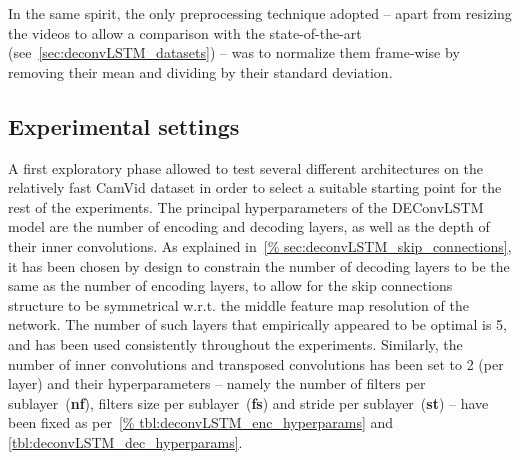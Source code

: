 In the same spirit, the only preprocessing technique adopted -- apart from
resizing the videos to allow a comparison with the state-of-the-art
(see~\autoref{sec:deconvLSTM_datasets}) -- was to normalize them frame-wise by
removing their mean and dividing by their standard deviation.

\subsection{Experimental settings}\label{sec:deconvLSTM_settings}

A first exploratory phase allowed to test several different architectures on
the relatively fast CamVid dataset in order to select a suitable starting point
for the rest of the experiments. The principal hyperparameters of the
DEConvLSTM model are the number of encoding and decoding layers, as well as the
depth of their inner convolutions. As explained in~\autoref{%
sec:deconvLSTM_skip_connections}, it has been chosen by design to constrain the
number of decoding layers to be the same as the number of encoding layers, to
allow for the skip connections structure to be symmetrical w.r.t. the middle
feature map resolution of the network. The number of such layers that
empirically appeared to be optimal is 5, and has been used consistently
throughout the experiments.
Similarly, the number of inner convolutions and transposed convolutions has
been set to 2 (per layer) and their hyperparameters -- namely the number of
filters per sublayer~(\textbf{nf}), filters size per sublayer~(\textbf{fs}) and
stride per sublayer~(\textbf{st}) -- have been fixed as per~\autoref{%
tbl:deconvLSTM_enc_hyperparams} and \autoref{tbl:deconvLSTM_dec_hyperparams}.


